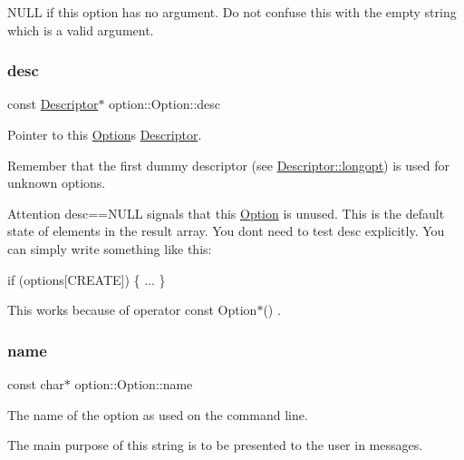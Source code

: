 N\+U\+LL if this option has no argument. Do not confuse this with the empty string which is a valid argument. \mbox{\label{classoption_1_1Option_af8d664a7b5de1425008b1812a90a0c23}} 
\subsubsection{\texorpdfstring{desc}{desc}}
{\footnotesize\ttfamily const \hyperlink{structoption_1_1Descriptor}{Descriptor}$\ast$ option\+::\+Option\+::desc}



Pointer to this \hyperlink{classoption_1_1Option}{Option}\textquotesingle{}s \hyperlink{structoption_1_1Descriptor}{Descriptor}. 

Remember that the first dummy descriptor (see \hyperlink{structoption_1_1Descriptor_a470c449dfa894c9bfda2dae026142b4b}{Descriptor\+::longopt}) is used for unknown options.

\begin{DoxyAttention}{Attention}
{\ttfamily desc==N\+U\+LL} signals that this \hyperlink{classoption_1_1Option}{Option} is unused. This is the default state of elements in the result array. You don\textquotesingle{}t need to test {\ttfamily desc} explicitly. You can simply write something like this\+: 
\begin{DoxyCode}
\textcolor{keywordflow}{if} (options[CREATE])
\{
  ...
\}
\end{DoxyCode}
 This works because of {\ttfamily  operator const Option$\ast$() }. 
\end{DoxyAttention}
\mbox{\label{classoption_1_1Option_a02a76b4896abd22d0ba8514362261de9}} 
\subsubsection{\texorpdfstring{name}{name}}
{\footnotesize\ttfamily const char$\ast$ option\+::\+Option\+::name}



The name of the option as used on the command line. 

The main purpose of this string is to be presented to the user in messages.

